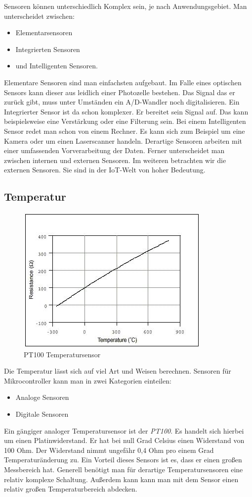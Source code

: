 Sensoren können unterschiedlich Komplex sein, je nach Anwendungsgebiet. Man unterscheidet zwischen:
\begin{itemize}
\item Elementarsensoren
\item Integrierten Sensoren
\item und Intelligenten Sensoren.
\end{itemize}

Elementare Sensoren sind man einfachsten aufgebaut. Im Falle eines optischen Sensors kann dieser aus leidlich einer Photozelle bestehen. Das Signal das er zurück gibt, muss unter Umständen ein A/D-Wandler noch digitalisieren. 
Ein Integrierter Sensor ist da schon komplexer. Er bereitet sein Signal auf. Das kann beispielsweise eine Verstärkung oder eine Filterung sein. Bei einem Intelligenten Sensor redet man schon von einem Rechner. Es kann sich zum Beispiel um eine Kamera oder um einen Laserscanner handeln. Derartige Sensoren arbeiten mit einer umfassenden Vorverarbeitung der Daten. 
Ferner unterscheidet man zwischen internen und externen Sensoren. Im weiteren betrachten wir die externen Sensoren. Sie sind in der IoT-Welt von hoher Bedeutung.
\cite{strand}
\subsection{Temperatur}
\begin{figure}
\includegraphics[scale=1]{bilder/pt100} 
\caption[PT100 Temperatursensor]{PT100 Temperatursensor \cite{pt100} }
\label{PT100}
\end{figure}
Die Temperatur lässt sich auf viel Art und Weisen berechnen. Sensoren für Mikrocontroller kann man in zwei Kategorien einteilen:
\begin{itemize}
\item Analoge Sensoren
\item Digitale Sensoren
\end{itemize}
Ein gängiger analoger Temperatursensor ist der \textit{PT100}. Es handelt sich hierbei um einen Platinwiderstand. Er hat bei null Grad Celsius einen Widerstand von 100 Ohm. Der Widerstand nimmt ungefähr 0,4 Ohm pro einem Grad Temperaturänderung zu. Ein Vorteil dieses Sensors ist es, dass er einen großen Messbereich hat. Generell benötigt man für derartige Temperatursensoren eine relativ komplexe Schaltung. Außerdem kann kann man mit dem Sensor einen relativ großen Temperaturbereich abdecken.

